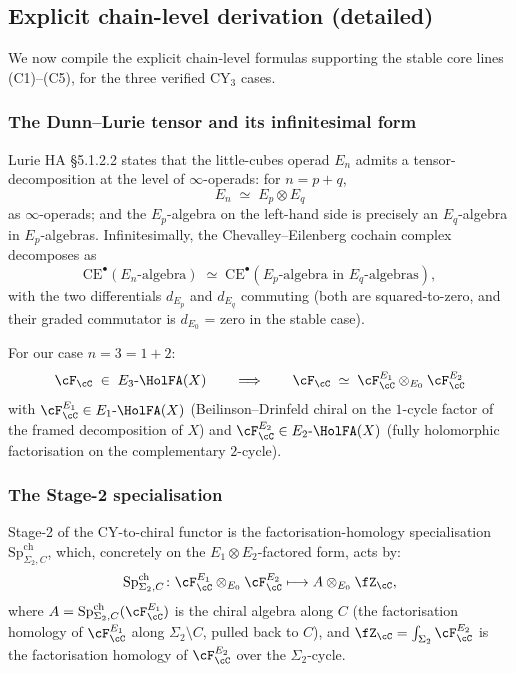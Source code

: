 \subsection*{Explicit chain-level derivation (detailed)}

We now compile the explicit chain-level formulas supporting the stable
core lines (C1)--(C5), for the three verified CY$_3$ cases.

\subsubsection*{The Dunn--Lurie tensor and its infinitesimal form}

Lurie HA \S5.1.2.2 states that the little-cubes operad
$E_n$ admits a tensor-decomposition at the level of
$\infty$-operads: for $n = p + q$,
\[
 E_n \;\simeq\; E_p \otimes E_q
\]
as $\infty$-operads; and the $E_p$-algebra on the left-hand side is
precisely an $E_q$-algebra in $E_p$-algebras.  Infinitesimally, the
Chevalley--Eilenberg cochain complex decomposes as
\[
 \mathrm{CE}^\bullet(E_n\text{-algebra})
 \;\simeq\; \mathrm{CE}^\bullet(E_p\text{-algebra in }E_q\text{-algebras}),
\]
with the two differentials $d_{E_p}$ and $d_{E_q}$ commuting (both
are squared-to-zero, and their graded commutator is $d_{E_0}$ = zero
in the stable case).

For our case $n = 3 = 1 + 2$:
\[
 \cF_\cC \;\in\; E_3\text{-}\HolFA(X) \qquad\Longrightarrow\qquad
 \cF_\cC \;\simeq\; \cF^{E_1}_\cC \otimes_{E_0} \cF^{E_2}_\cC
\]
with $\cF^{E_1}_\cC \in E_1\text{-}\HolFA(X)$ (Beilinson--Drinfeld
chiral on the $1$-cycle factor of the framed decomposition of $X$) and
$\cF^{E_2}_\cC \in E_2\text{-}\HolFA(X)$ (fully holomorphic
factorisation on the complementary $2$-cycle).

\subsubsection*{The Stage-2 specialisation}

Stage-2 of the CY-to-chiral functor is the factorisation-homology
specialisation $\mathrm{Sp}^{\mathrm{ch}}_{\Sigma_2, C}$, which,
concretely on the $E_1 \otimes E_2$-factored form, acts by:
\[
 \mathrm{Sp}^{\mathrm{ch}}_{\Sigma_2, C}
 \colon \cF^{E_1}_\cC \otimes_{E_0} \cF^{E_2}_\cC
 \longmapsto
 A \otimes_{E_0} \fZ_\cC,
\]
where $A = \mathrm{Sp}^{\mathrm{ch}}_{\Sigma_2, C}(\cF^{E_1}_\cC)$ is
the chiral algebra along $C$ (the factorisation homology of
$\cF^{E_1}_\cC$ along $\Sigma_2 \setminus C$, pulled back to $C$),
and $\fZ_\cC = \int_{\Sigma_2} \cF^{E_2}_\cC$ is the factorisation
homology of $\cF^{E_2}_\cC$ over the $\Sigma_2$-cycle.

